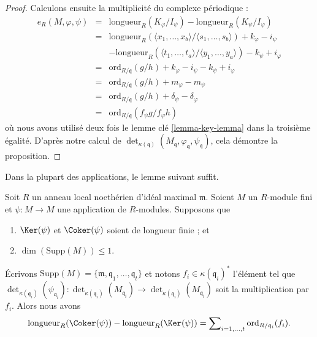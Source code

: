 \begin{proof}
\medskip\noindent
Calculons ensuite la multiplicité du complexe périodique :
\begin{eqnarray*}
e_R(M, \varphi, \psi) & = &
\text{longueur}_R(K_\varphi/I_\psi) - \text{longueur}_R(K_\psi/I_\varphi) \\
& = &
\text{longueur}_R(
\langle x_1, \ldots, x_b\rangle/
\langle s_1, \ldots, s_b\rangle)
+ k_\varphi - i_\psi \\
& & -
\text{longueur}_R(
\langle t_1, \ldots, t_a\rangle/
\langle y_1, \ldots, y_a\rangle)
- k_\psi + i_\varphi \\
& = &
\text{ord}_{R/\mathfrak q}(g/h) + k_\varphi - i_\psi - k_\psi + i_\varphi \\
& = &
\text{ord}_{R/\mathfrak q}(g/h) + m_\varphi - m_\psi \\
& = &
\text{ord}_{R/\mathfrak q}(g/h) + \delta_\psi - \delta_\varphi \\
& = &
\text{ord}_{R/\mathfrak q}(f_\psi g/f_\varphi h)
\end{eqnarray*}
où nous avons utilisé deux fois le lemme clé \ref{lemma-key-lemma} dans la troisième égalité.
D'après notre calcul de $\det_{\kappa(\mathfrak q)}
(M_{\mathfrak q}, \varphi_{\mathfrak q}, \psi_{\mathfrak q})$,
cela démontre la proposition.
\end{proof}

\noindent
Dans la plupart des applications, le lemme suivant suffit.

\begin{lemma}
\label{lemma-application-herbrand-quotient}
Soit $R$ un anneau local noethérien d'idéal maximal $\mathfrak m$.
Soient $M$ un $R$-module fini et $\psi : M \to M$ une
application de $R$-modules. Supposons que
\begin{enumerate}
\item $\Ker(\psi)$ et $\Coker(\psi)$ soient de longueur finie ; et
\item $\dim(\text{Supp}(M)) \leq 1$.
\end{enumerate}
Écrivons
$\text{Supp}(M) = \{\mathfrak m, \mathfrak q_1, \ldots, \mathfrak q_t\}$
et notons $f_i \in \kappa(\mathfrak q_i)^*$ l'élément tel que
$\det_{\kappa(\mathfrak q_i)}(\psi_{\mathfrak q_i}) :
\det_{\kappa(\mathfrak q_i)}(M_{\mathfrak q_i})
\to \det_{\kappa(\mathfrak q_i)}(M_{\mathfrak q_i})$
soit la multiplication par $f_i$. Alors
nous avons
$$
\text{longueur}_R(\Coker(\psi))
-
\text{longueur}_R(\Ker(\psi))
=
\sum\nolimits_{i = 1, \ldots, t}
\text{ord}_{R/\mathfrak q_i}(f_i).
$$
\end{lemma}

